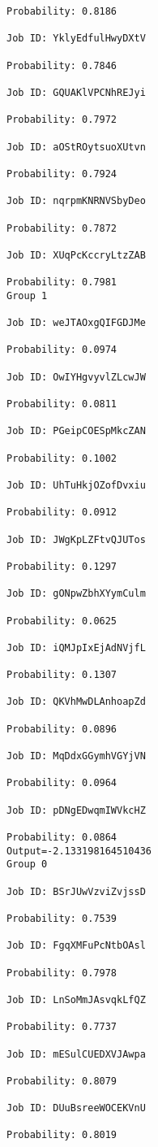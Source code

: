 \documentclass[11pt]{article}
\begin{document}
\begin{Verbatim}[commandchars=\\\{\}]
Probability: 0.8186

Job ID: YklyEdfulHwyDXtV

Probability: 0.7846

Job ID: GQUAKlVPCNhREJyi

Probability: 0.7972

Job ID: aOStROytsuoXUtvn

Probability: 0.7924

Job ID: nqrpmKNRNVSbyDeo

Probability: 0.7872

Job ID: XUqPcKccryLtzZAB

Probability: 0.7981
Group 1

Job ID: weJTAOxgQIFGDJMe

Probability: 0.0974

Job ID: OwIYHgvyvlZLcwJW

Probability: 0.0811

Job ID: PGeipCOESpMkcZAN

Probability: 0.1002

Job ID: UhTuHkjOZofDvxiu

Probability: 0.0912

Job ID: JWgKpLZFtvQJUTos

Probability: 0.1297

Job ID: gONpwZbhXYymCulm

Probability: 0.0625

Job ID: iQMJpIxEjAdNVjfL

Probability: 0.1307

Job ID: QKVhMwDLAnhoapZd

Probability: 0.0896

Job ID: MqDdxGGymhVGYjVN

Probability: 0.0964

Job ID: pDNgEDwqmIWVkcHZ

Probability: 0.0864
Output=-2.133198164510436
Group 0

Job ID: BSrJUwVzviZvjssD

Probability: 0.7539

Job ID: FgqXMFuPcNtbOAsl

Probability: 0.7978

Job ID: LnSoMmJAsvqkLfQZ

Probability: 0.7737

Job ID: mESulCUEDXVJAwpa

Probability: 0.8079

Job ID: DUuBsreeWOCEKVnU

Probability: 0.8019


\end{Verbatim}
\end{document}
